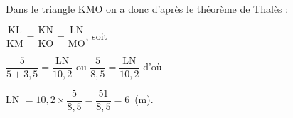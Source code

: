 Dans le triangle KMO on a donc d'après le théorème de Thalès :

$\dfrac{\text{KL}}{\text{KM}} = \dfrac{\text{KN}}{\text{KO}} = \dfrac{\text{LN}}{\text{MO}}$, soit 

$\dfrac{5}{5 + 3,5} =  \dfrac{\text{LN}}{10,2}$ ou $\dfrac{5}{8,5} =  \dfrac{\text{LN}}{10,2}$ d'où

LN $ = 10,2 \times \dfrac{5}{8,5} = \dfrac{51}{8,5} = 6$~(m).

